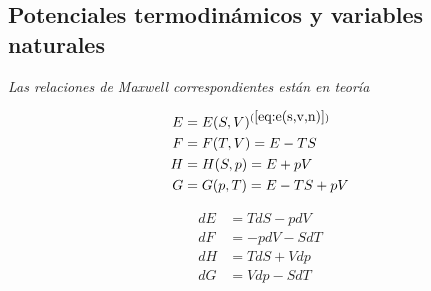 \subsection{Potenciales termodinámicos y variables naturales}
\textit{Las relaciones de Maxwell correspondientes están en teoría}\txtsi{ }{(\ref{relaciones-maxwell})}


\begin{minipage}{0.5\textwidth}
    \begin{equation}
        \begin{split}
            E &= E(S,V)^{(\ref{eq:e(s,v,n)})}\\
            F &= F(T,V) = E - TS\\
            H &= H(S,p) = E + pV\\
            G &= G(p,T) = E - TS + pV
        \end{split}
        \nonumber
    \end{equation}
\end{minipage}%
\begin{minipage}{0.5\textwidth}
    \begin{equation}
        \begin{split}
            dE &= TdS - pdV\\
            dF &= -pdV - SdT\\
            dH &= TdS + Vdp\\
            dG &= Vdp - SdT
        \end{split}
        \nonumber
    \end{equation}
\end{minipage}%
    

\newpage
